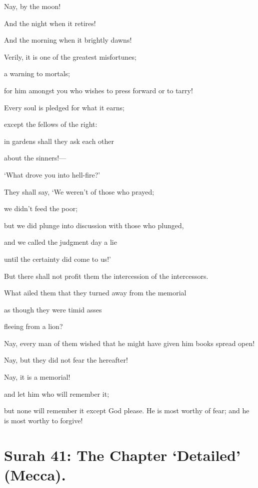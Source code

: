 \documentclass[fontsize=14pt, letterpaper, notitlepage, openany, DIV=12]{scrbook} %
\begin{document}
\noindent[74:32]
Nay, by the moon!

\noindent[74:33]
And the night when it retires!

\noindent[74:34]
And the morning when it brightly dawns!

\noindent[74:35]
Verily, it is one of the greatest misfortunes;

\noindent[74:36]
a warning to mortals;

\noindent[74:37]
for him amongst you who wishes to press forward or to tarry!

\noindent[74:38]
Every soul is pledged for what it earns;

\noindent[74:39]
except the fellows of the right:

\noindent[74:40]
in gardens shall they ask each other

\noindent[74:41]
about the sinners!---

\noindent[74:42]
`What drove you into hell-fire?'

\noindent[74:43]
They shall say, `We weren't of those who prayed;

\noindent[74:44]
we didn't feed the poor;

\noindent[74:45]
but we did plunge into discussion with those who plunged,

\noindent[74:46]
and we called the judgment day a lie

\noindent[74:47]
until the certainty did come to us!'

\noindent[74:48]
But there shall not profit them the intercession of the intercessors.

\noindent[74:49]
What ailed them that they turned away from the memorial

\noindent[74:50]
as though they were timid asses

\noindent[74:51]
fleeing from a lion?

\noindent[74:52]
Nay, every man of them wished that he might have given him books spread open!

\noindent[74:53]
Nay, but they did not fear the hereafter!

\noindent[74:54]
Nay, it is a memorial!

\noindent[74:55]
and let him who will remember it;

\noindent[74:56]
but none will remember it except God please. He is most worthy of fear; and he is most
worthy to forgive!


\section{Surah 41: The Chapter `Detailed' (Mecca).}
\end{document}
